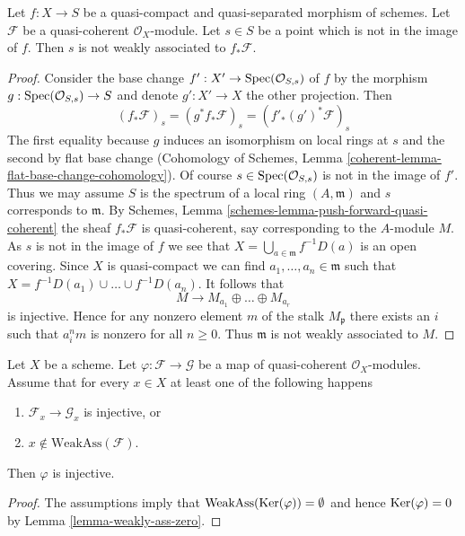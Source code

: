 \begin{lemma}
\label{lemma-weakass-pushforward}
Let $f : X \to S$ be a quasi-compact and quasi-separated morphism of schemes.
Let $\mathcal{F}$ be a quasi-coherent $\mathcal{O}_X$-module.
Let $s \in S$ be a point which is not in the image of $f$. Then
$s$ is not weakly associated to $f_*\mathcal{F}$.
\end{lemma}

\begin{proof}
Consider the base change $f' : X' \to \mathop{\mathrm{Spec}}(\mathcal{O}_{S, s})$
of $f$ by the morphism $g : \mathop{\mathrm{Spec}}(\mathcal{O}_{S, s}) \to S$
and denote $g' : X' \to X$ the other projection.
Then
$$
(f_*\mathcal{F})_s = (g^*f_*\mathcal{F})_s = (f'_*(g')^*\mathcal{F})_s
$$
The first equality because $g$ induces an isomorphism on local
rings at $s$ and the second by flat base change (Cohomology of Schemes, Lemma
\ref{coherent-lemma-flat-base-change-cohomology}). Of course
$s \in \mathop{\mathrm{Spec}}(\mathcal{O}_{S, s})$ is not in the image of $f'$.
Thus we may assume $S$ is the spectrum of a local ring
$(A, \mathfrak m)$ and $s$ corresponds to $\mathfrak m$.
By Schemes, Lemma \ref{schemes-lemma-push-forward-quasi-coherent}
the sheaf $f_*\mathcal{F}$ is quasi-coherent, say corresponding
to the $A$-module $M$. As $s$ is not in the image of $f$ we see that
$X = \bigcup_{a \in \mathfrak m} f^{-1}D(a)$ is an open covering.
Since $X$ is quasi-compact we can find $a_1, \ldots, a_n \in \mathfrak m$
such that $X = f^{-1}D(a_1) \cup \ldots \cup f^{-1}D(a_n)$. It follows
that
$$
M \to M_{a_1} \oplus \ldots \oplus M_{a_r}
$$
is injective. Hence for any nonzero element $m$ of the stalk $M_\mathfrak p$
there exists an $i$ such that $a_i^n m$ is nonzero for all $n \geq 0$.
Thus $\mathfrak m$ is not weakly associated to $M$.
\end{proof}

\begin{lemma}
\label{lemma-check-injective-on-weakass}
Let $X$ be a scheme. Let $\varphi : \mathcal{F} \to \mathcal{G}$ be a map of
quasi-coherent $\mathcal{O}_X$-modules. Assume that for every $x \in X$
at least one of the following happens
\begin{enumerate}
\item $\mathcal{F}_x \to \mathcal{G}_x$ is injective, or
\item $x \not \in \text{WeakAss}(\mathcal{F})$.
\end{enumerate}
Then $\varphi$ is injective.
\end{lemma}

\begin{proof}
The assumptions imply that $\text{WeakAss}(\mathop{\mathrm{Ker}}(\varphi)) = \emptyset$
and hence $\mathop{\mathrm{Ker}}(\varphi) = 0$ by Lemma \ref{lemma-weakly-ass-zero}.
\end{proof}


